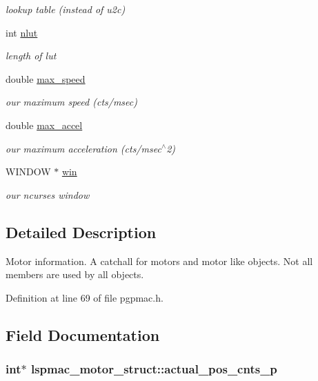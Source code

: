 \begin{DoxyCompactItemize}
\begin{DoxyCompactList}\small\item\em lookup table (instead of u2c) \item\end{DoxyCompactList}\item 
int \hyperlink{structlspmac__motor__struct_a11cbc6f50c150ed446e9a901cf7cc12b}{nlut}
\begin{DoxyCompactList}\small\item\em length of lut \item\end{DoxyCompactList}\item 
double \hyperlink{structlspmac__motor__struct_af27159eeef80e4438446e01f24fae9d5}{max\_\-speed}
\begin{DoxyCompactList}\small\item\em our maximum speed (cts/msec) \item\end{DoxyCompactList}\item 
double \hyperlink{structlspmac__motor__struct_afec8dc1d4b97ba9c1d6e4f7a088342e4}{max\_\-accel}
\begin{DoxyCompactList}\small\item\em our maximum acceleration (cts/msec$^\wedge$2) \item\end{DoxyCompactList}\item 
WINDOW $\ast$ \hyperlink{structlspmac__motor__struct_a133775154b0e008f3a2fde6f53bc0eff}{win}
\begin{DoxyCompactList}\small\item\em our ncurses window \item\end{DoxyCompactList}\end{DoxyCompactItemize}


\subsection{Detailed Description}
Motor information. A catchall for motors and motor like objects. Not all members are used by all objects. 

Definition at line 69 of file pgpmac.h.

\subsection{Field Documentation}
\hypertarget{structlspmac__motor__struct_a312047bb71def5cd2443fecd875eaea5}{
\subsubsection[{actual\_\-pos\_\-cnts\_\-p}]{\setlength{\rightskip}{0pt plus 5cm}int$\ast$ {\bf lspmac\_\-motor\_\-struct::actual\_\-pos\_\-cnts\_\-p}}}
\label{structlspmac__motor__struct_a312047bb71def5cd2443fecd875eaea5}


